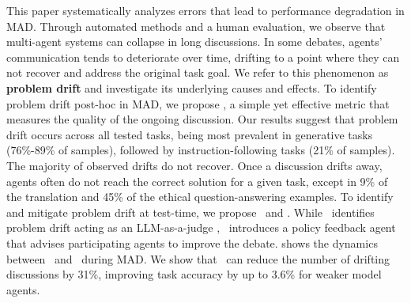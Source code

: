 This paper systematically analyzes errors that lead to performance degradation in MAD.
Through automated methods and a human evaluation, we observe that multi-agent systems can collapse in long discussions.
In some debates, agents' communication tends to deteriorate over time, drifting to a point where they can not recover and address the original task goal.
We refer to this phenomenon as \textbf{problem drift} and investigate its underlying causes and effects.
To identify problem drift post-hoc in MAD, we propose \metric, a simple yet effective metric that measures the quality of the ongoing discussion.
Our results suggest that problem drift occurs across all tested tasks, being most prevalent in generative tasks (76\%-89\% of samples), followed by instruction-following tasks (21\% of samples).
The majority of observed drifts do not recover.
Once a discussion drifts away, agents often do not reach the correct solution for a given task, except in 9\% of the translation and 45\% of the ethical question-answering examples. %
To identify and mitigate problem drift at test-time, we propose \judge\ and \policy.
While \judge\ identifies problem drift acting as an LLM-as-a-judge \citep{ZhengCSZ23}, \policy\ introduces a policy feedback agent \citep{FuPKL23b} that advises participating agents to improve the debate.
 shows the dynamics between \judge\ and \policy\ during MAD.
We show that \policy\ can reduce the number of drifting discussions by 31\%, improving task accuracy by up to 3.6\% for weaker model agents.

